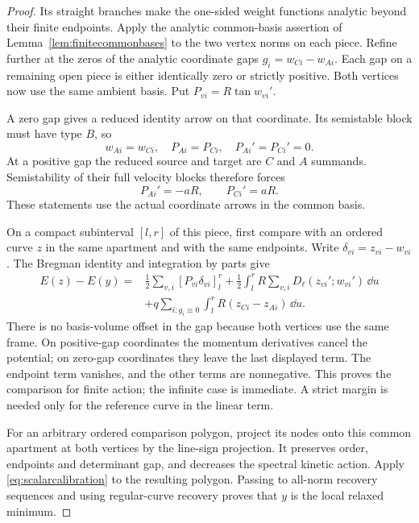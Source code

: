 \begin{proof}
Its straight branches make the one-sided weight functions
analytic beyond their finite endpoints. Apply the analytic
common-basis assertion of Lemma~\ref{lem:finitecommonbases}
to the two vertex norms on each piece. Refine further at the
zeros of the analytic coordinate gaps $g_i=w_{Ci}-w_{Ai}$.
Each gap on a remaining open piece is either identically zero
or strictly positive. Both vertices now use the same ambient
basis. Put $P_{vi}=R\tan w_{vi}'$.

A zero gap gives a reduced identity arrow on that coordinate.
Its semistable block must have type $B$, so
\[
 w_{Ai}=w_{Ci},\quad P_{Ai}=P_{Ci},\quad
 P_{Ai}'=P_{Ci}'=0.
\]
At a positive gap the reduced source and target are $C$ and
$A$ summands. Semistability of their full velocity blocks
therefore forces
\[
 P_{Ai}'=-aR,\qquad P_{Ci}'=aR.
\]
These statements use the actual coordinate arrows in the
common basis.

On a compact subinterval $[l,r]$ of this piece, first compare
with an ordered curve $z$ in the same apartment and with the
same endpoints. Write $\delta_{vi}=z_{vi}-w_{vi}$.
The Bregman identity and integration by parts give
\begin{equation}\label{eq:scalarcalibration}
 \begin{split}
 E(z)-E(y)={}&\frac12\sum_{v,i}[P_{vi}\delta_{vi}]_l^r
   +\frac12\int_l^r R\sum_{v,i}D_\ell(z_{vi}';w_{vi}')\,\dd u\\
 &+q\sum_{i:g_i\equiv0}\int_l^r R(z_{Ci}-z_{Ai})\,\dd u.
 \end{split}
\end{equation}
There is no basis-volume offset in the gap because both
vertices use the same frame. On positive-gap coordinates the
momentum derivatives cancel the potential; on zero-gap
coordinates they leave the last displayed term.
The endpoint term vanishes, and the other terms are nonnegative.
This proves the comparison for finite action; the infinite
case is immediate. A strict margin is needed only for the
reference curve in the linear term.

For an arbitrary ordered comparison polygon, project its nodes
onto this common apartment at both vertices by the line-sign
projection. It preserves order, endpoints and determinant gap,
and decreases the spectral kinetic action. Apply
\eqref{eq:scalarcalibration} to the resulting polygon.
Passing to all-norm recovery sequences and using regular-curve
recovery proves that $y$ is the local relaxed minimum.
\end{proof}

